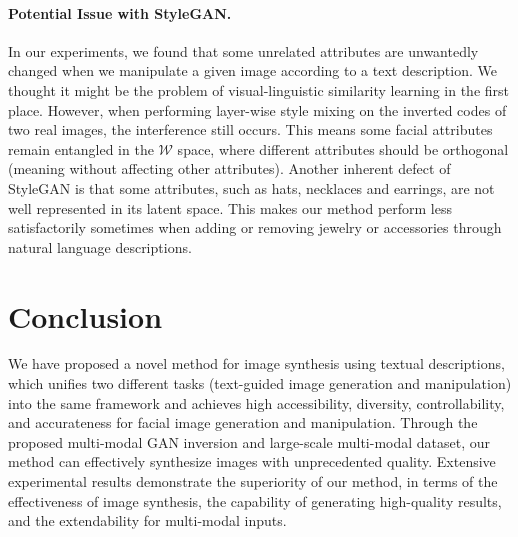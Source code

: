 \documentclass[final]{cvpr}
\begin{document}
\vspace{-5pt}
\paragraph{Potential Issue with StyleGAN.}
In our experiments, we found that some unrelated attributes are unwantedly changed when we manipulate a given image according to a text description.
We thought it might be the problem of visual-linguistic similarity learning in the first place. 
However, when performing layer-wise style mixing on the inverted codes of two real images, the interference still occurs.
This means some facial attributes remain entangled in the $\mathcal{W}$ space, where different attributes should be orthogonal (meaning without affecting other attributes).
Another inherent defect of StyleGAN is that some attributes, such as hats, necklaces and earrings, are not well represented in its latent space. This makes our method perform less satisfactorily sometimes when adding or removing jewelry or accessories through natural language descriptions.

\section{Conclusion}
\label{sec:conclusion}
We have proposed a novel method for image synthesis using textual descriptions, which unifies two different tasks (text-guided image generation and manipulation) into the same framework and achieves high accessibility, diversity, controllability, and accurateness for facial image generation and manipulation.
Through the proposed multi-modal GAN inversion and large-scale multi-modal dataset, our method can effectively synthesize images with unprecedented quality.
Extensive experimental results demonstrate the superiority of our method, in terms of the effectiveness of image synthesis, the capability of generating high-quality results, and the extendability for multi-modal inputs.


{\small


}
\end{document}
